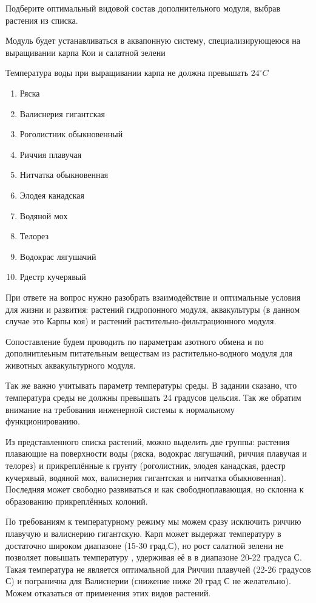 
Подберите оптимальный видовой состав дополнительного модуля, выбрав растения из списка.

Модуль будет устанавливаться в аквапонную систему, специализирующеюся на выращивании карпа Кои и салатной зелени

Температура воды при выращивании карпа не должна превышать $24^{\circ}C$

\begin{enumerate}
    \item Ряска
    \item Валиснерия гигантская
    \item Роголистник обыкновенный
    \item Риччия плавучая
    \item Нитчатка обыкновенная
    \item Элодея канадская
    \item Водяной мох
    \item Телорез
    \item Водокрас лягушачий
    \item Рдестр кучерявый
\end{enumerate}

\explanationSection

При ответе на вопрос нужно разобрать взаимодействие и оптимальные условия для жизни и развития: растений гидропонного модуля, аквакультуры (в данном случае это Карпы коя) и растений растительно-фильтрационного модуля.

Сопоставление будем проводить по параметрам азотного обмена и по дополнитлеьным питательным веществам из растительно-водного модуля для животных аквакультурного модуля.

Так же важно учитывать параметр температуры среды. В задании сказано, что температура среды не должны превышать 24 градусов цельсия. Так же обратим внимание на требования инженерной системы к нормальному функционированию.

Из представленного списка растений, можно выделить две группы: растения плавающие на поверхности воды (ряска, водокрас лягушачий, риччия плавучая и телорез) и прикреплённые к грунту (роголистник, элодея канадская, рдестр кучерявый, водяной мох, валиснерия гигантская и нитчатка обыкновенная). Последняя может свободно развиваться и как свободноплавающая, но склонна к образованию прикреплённых колоний.

По требованиям к температурному режиму мы можем сразу исключить риччию плавучую и валиснерию гигантскую. Карп может выдержат температуру в достаточно широком диапазоне (15-30 град.С), но рост салатной зелени не позволяет повышать температуру , удерживая её в в диапазоне 20-22 градуса С. Такая температура не является оптимальной для Риччии плавучей (22-26 градусов С) и погранична для Валиснерии (снижение ниже 20 град С не желательно). Можем отказаться от применения этих видов растений.

